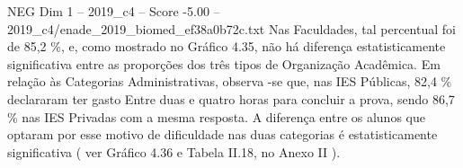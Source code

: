 \begin{textsample}{NEG Dim 1 – 2019\_c4 – Score -5.00 – 2019\_c4/enade\_2019\_biomed\_ef38a0b72c.txt}
Nas Faculdades, tal percentual foi de 85,2 \%, e, como mostrado no Gráfico 4.35, não há diferença estatisticamente significativa entre as proporções dos três tipos de Organização Acadêmica.
Em relação às Categorias Administrativas, observa -se que, nas IES Públicas, 82,4 \% declararam ter gasto Entre duas e quatro horas para concluir a prova, sendo 86,7 \% nas IES Privadas com a mesma resposta.
A diferença entre os alunos que optaram por esse motivo de dificuldade nas duas categorias é estatisticamente significativa ( ver Gráfico 4.36 e Tabela II.18, no Anexo II ).

\end{textsample}
